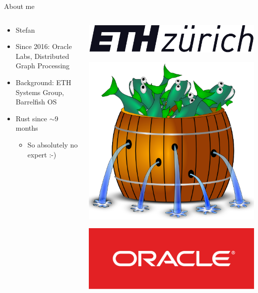\documentclass[aspectratio=169]{beamer}
\begin{document}
\begin{frame}[c]{About me}{}

  \begin{columns}
    \begin{column}{.75\linewidth}
      \begin{itemize}
        \item Stefan
        \item Since 2016: Oracle Labs, Distributed Graph Processing
        \item Background: ETH Systems Group, Barrelfish OS
        \item Rust since $\sim$9 months
          \begin{itemize}
          \item So absolutely no expert :-)
          \end{itemize}
      \end{itemize}
    \end{column}

    \begin{column}{.25\linewidth}
      \includegraphics[width=.8\linewidth]{figs/eth_logo}

      \vspace{.5cm}
      \includegraphics[width=.8\linewidth]{figs/barrelfish}

      \vspace{.5cm}
      \includegraphics[width=.8\linewidth]{figs/oracle_logo}
    \end{column}
  \end{columns}
\end{frame}
\end{document}
